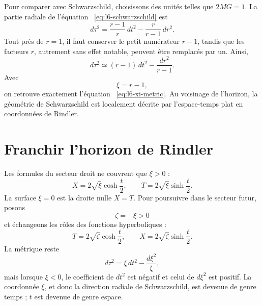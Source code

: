 Pour comparer avec Schwarzschild, choisissons des unités telles que \(2MG=1\). La partie radiale de l’équation ~\eqref{eq:l6-schwarzschild} est
\begin{equation}
d\tau^{2}
=
\frac{r-1}{r}\,dt^{2}
-
\frac{r}{r-1}\,dr^{2}.
\end{equation}
Tout près de \(r=1\), il faut conserver le petit numérateur \(r-1\), tandis que les facteurs \(r\), autrement sans effet notable, peuvent être remplacés par un. Ainsi,
\begin{equation}
d\tau^{2}
\simeq
(r-1)\,dt^{2}
-
\frac{dr^{2}}{r-1}.
\end{equation}
Avec
\begin{equation}
\xi=r-1,
\end{equation}
on retrouve exactement l’équation ~\eqref{eq:l6-xi-metric}. Au voisinage de l’horizon, la géométrie de Schwarzschild est localement décrite par l’espace-temps plat en coordonnées de Rindler.

\begin{classroomqa}
\end{classroomqa}

\section{Franchir l’horizon de Rindler}

Les formules du secteur droit ne couvrent que \(\xi>0\) :
\begin{equation}
X=2\sqrt{\xi}\cosh\frac{t}{2},
\qquad
T=2\sqrt{\xi}\sinh\frac{t}{2}.
\label{eq:l6-rindler-outside}
\end{equation}
La surface \(\xi=0\) est la droite nulle \(X=T\). Pour poursuivre dans le secteur futur, posons
\begin{equation}
\zeta=-\xi>0
\end{equation}
et échangeons les rôles des fonctions hyperboliques :
\begin{equation}
T=2\sqrt{\zeta}\cosh\frac{t}{2},
\qquad
X=2\sqrt{\zeta}\sinh\frac{t}{2}.
\label{eq:l6-rindler-inside}
\end{equation}
La métrique reste
\begin{equation}
d\tau^{2}
=\xi\,dt^{2}-\frac{d\xi^{2}}{\xi},
\end{equation}
mais lorsque \(\xi<0\), le coefficient de \(dt^{2}\) est négatif et celui de \(d\xi^{2}\) est positif. La coordonnée \(\xi\), et donc la direction radiale de Schwarzschild, est devenue de genre temps ; \(t\) est devenue de genre espace.

